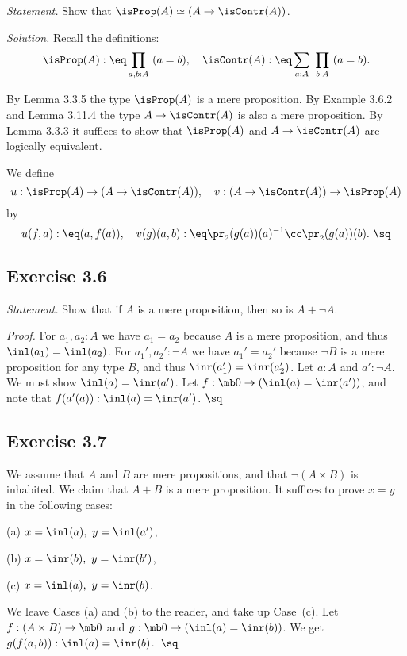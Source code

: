 \documentclass[12pt]{article}
\begin{document}
\emph{Statement.} Show that $\isProp(A)\simeq(A\to\isContr(A))$. 

\nn\emph{Solution.} Recall the definitions: 
$$
\isProp(A):\eq\prod_{a,b:A}\ (a=b),\quad\isContr(A):\eq\sum_{a:A}\ \prod_{b:A}\ (a=b).
$$

By Lemma 3.3.5 the type $\isProp(A)$ is a mere proposition. By Example 3.6.2 and Lemma 3.11.4 the type $A\to\isContr(A)$ is also a mere proposition. By Lemma 3.3.3 it suffices to show that $\isProp(A)$ and $A\to\isContr(A)$ are logically equivalent. 

We define 
$$
u:\isProp(A)\to(A\to\isContr(A)),\quad v:(A\to\isContr(A))\to\isProp(A)
$$ 
by 
$$
u(f,a):\eq(a,f(a)),\quad v(g)(a,b):\eq\pr_2(g(a))(a)^{-1}\cc\pr_2(g(a))(b).\ \sq
$$


\subsection{Exercise 3.6}\label{e36}

\emph{Statement.} Show that if $A$ is a mere proposition, then so is $A+\neg A$.

\nn\emph{Proof.} For $a_1,a_2:A$ we have $a_1=a_2$ because $A$ is a mere proposition, and thus $\inl(a_1)=\inl(a_2)$. For $a_1',a_2':\neg A$ we have $a_1'=a_2'$ because $\neg B$ is a mere proposition for any type $B$, and thus $\inr(a_1')=\inr(a_2')$. Let $a:A$ and $a':\neg A$. We must show $\inl(a)=\inr(a')$. Let $f:\mb0\to(\inl(a)=\inr(a'))$, and note that $f(a'(a)):\inl(a)=\inr(a')$. $\sq$


\subsection{Exercise 3.7}

We assume that $A$ and $B$ are mere propositions, and that $\neg(A\times B)$ is inhabited. We claim that $A+B$ is a mere proposition. It suffices to prove $x=y$ in the following cases:

(a) $x=\inl(a),\ y=\inl(a')$,

(b) $x=\inr(b),\ y=\inr(b')$,

(c) $x=\inl(a),\ y=\inr(b)$.

\nn We leave Cases (a) and (b) to the reader, and take up Case~(c). Let $f:(A\times B)\to\mb0$ and $g:\mb0\to(\inl(a)=\inr(b))$. We get $g(f(a,b)):\inl(a)=\inr(b)$.\ $\sq$

\end{document}
